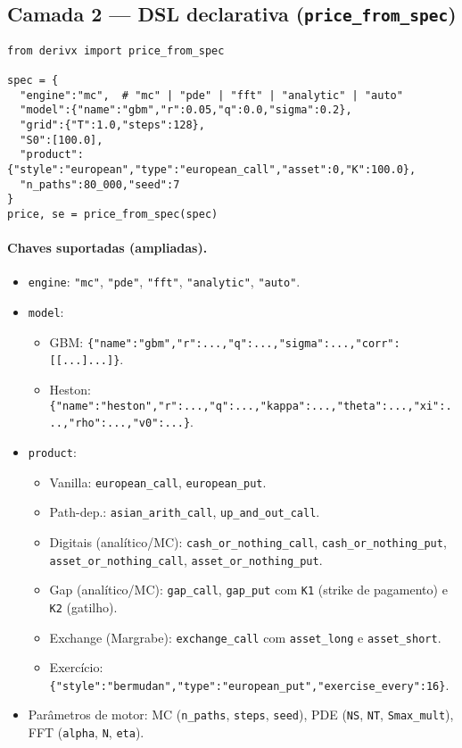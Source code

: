 ﻿\documentclass[11pt,a4paper]{article}
\begin{document}
\subsection{Camada 2 — DSL declarativa (\texttt{price\_from\_spec})}
\begin{lstlisting}[style=pystyle]
from derivx import price_from_spec

spec = {
  "engine":"mc",  # "mc" | "pde" | "fft" | "analytic" | "auto"
  "model":{"name":"gbm","r":0.05,"q":0.0,"sigma":0.2},
  "grid":{"T":1.0,"steps":128},
  "S0":[100.0],
  "product":{"style":"european","type":"european_call","asset":0,"K":100.0},
  "n_paths":80_000,"seed":7
}
price, se = price_from_spec(spec)
\end{lstlisting}

\paragraph{Chaves suportadas (ampliadas).}
\begin{itemize}[leftmargin=1.2em]
\item \texttt{engine}: \verb|"mc"|, \verb|"pde"|, \verb|"fft"|, \verb|"analytic"|, \verb|"auto"|.
\item \texttt{model}:
\begin{itemize}[nosep]
\item GBM: \verb|{"name":"gbm","r":...,"q":...,"sigma":...,"corr":[[...]...]}|.
\item Heston: \verb|{"name":"heston","r":...,"q":...,"kappa":...,"theta":...,"xi":...,"rho":...,"v0":...}|.
\end{itemize}
\item \texttt{product}:
\begin{itemize}[nosep]
\item Vanilla: \verb|european_call|, \verb|european_put|.
\item Path-dep.: \verb|asian_arith_call|, \verb|up_and_out_call|.
\item Digitais (analítico/MC): \verb|cash_or_nothing_call|, \verb|cash_or_nothing_put|,
\verb|asset_or_nothing_call|, \verb|asset_or_nothing_put|.
\item Gap (analítico/MC): \verb|gap_call|, \verb|gap_put| com \verb|K1| (strike de pagamento) e \verb|K2| (gatilho).
\item Exchange (Margrabe): \verb|exchange_call| com \verb|asset_long| e \verb|asset_short|.
\item Exercício: \verb|{"style":"bermudan","type":"european_put","exercise_every":16}|.
\end{itemize}
\item Parâmetros de motor: MC (\verb|n_paths|, \verb|steps|, \verb|seed|), PDE (\verb|NS|, \verb|NT|, \verb|Smax_mult|),
FFT (\verb|alpha|, \verb|N|, \verb|eta|).
\end{itemize}
\end{document}
